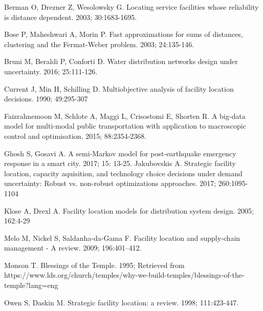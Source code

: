 \documentclass[twoside,twocolumn]{article}
\begin{document}

\begin{thebibliography}{99}

Berman O, Drezner Z, Wesolowsky G.
\newblock Locating service facilities whose reliability is distance dependent.
 2003; 30:1683-1695.

Bose P, Maheshwari A, Morin P.
\newblock Fast approximations for sums of distances, clustering and the Fermat-Weber problem.
 2003; 24:135-146.

Bruni M, Beraldi P, Conforti D.
\newblock Water distribution networks design under uncertainty.
 2016; 25:111-126.

Current J, Min H, Schilling D.
\newblock Multiobjective analysis of facility location decisions.
 1990; 49:295-307

Faizrahnemoon M, Schlote A, Maggi L, Crisostomi E, Shorten R.
\newblock A big-data model for multi-modal public transportation with application to macroscopic control and optimisation.
 2015; 88:2354-2368.

Ghosh S, Gosavi A.
\newblock A semi-Markov model for post-earthquake emergency response in a smart city.
 2017; 15: 13-25.
Jakubovskis A.
\newblock Strategic facility location, capacity aquisition, and technology choice decisions under demand uncertainty: Robust vs. non-robust optimizations approaches.
 2017; 260:1095-1104

Klose A, Drexl A.
\newblock Facility location models for distribution system design.
 2005; 162:4-29

Melo M, Nickel S, Saldanha-da-Gama F.
\newblock Facility location and supply-chain management - A review.
  2009; 196:401--412.

Monson T.
\newblock Blessings of the Temple. 1995;
\newblock Retrieved from https://www.lds.org/church/temples/why-we-build-temples/blessings-of-the-temple?lang=eng

Owen S, Daskin M.
\newblock Strategic facility location: a review.
 1998; 111:423-447.

\end{thebibliography}
\end{document}
